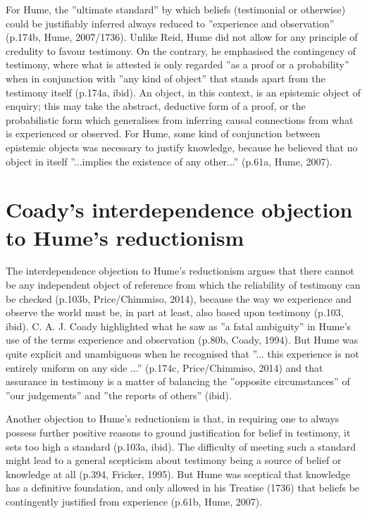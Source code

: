 \documentclass[a4paper, 11pt]{article} %
\begin{document}
\vspace{10pt}

For Hume, the ''ultimate standard'' by which beliefs (testimonial or otherwise) could be justifiably inferred always reduced to ''experience and observation'' (p.174b, Hume, 2007/1736)\cite{Hume:2007}. Unlike Reid, Hume did not allow for any principle of credulity to favour testimony. On the contrary, he emphasised the contingency of testimony, where what is attested is only regarded ''as a proof or a probability'' when in conjunction with ''any kind of object'' that stands apart from the testimony itself (p.174a, ibid)\cite{Hume:2007}. An object, in this context, is an epistemic object of enquiry; this may take the abstract, deductive form of a proof, or the probabilistic form which generalises from inferring causal connections from what is experienced or observed. For Hume, some kind of conjunction between epistemic objects was necessary to justify knowledge, because he believed that no object in itself ''...implies the existence of any other...'' (p.61a, Hume, 2007)\cite{Hume:2007}. 

\section*{Coady's interdependence objection to Hume's reductionism}

The interdependence objection to Hume's reductionism argues that there cannot be any independent object of reference from which the reliability of testimony can be checked (p.103b, Price/Chimmiso, 2014)\cite{Price/Chismisso:2014}, because the way we experience and observe the world must be, in part at least, also based upon testimony (p.103, ibid). C. A. J. Coady highlighted what he saw as ''a fatal ambiguity'' in Hume's use of the terms experience and observation (p.80b, Coady, 1994)\cite{Coady:1994}. But Hume was quite explicit and unambiguous when he recognised that ''... this experience is not entirely uniform on any side ...'' (p.174c, Price/Chimmiso, 2014)\cite{Price/Chismisso:2014} and that assurance in testimony is a matter of balancing the ''opposite circumstances'' of ''our judgements'' and ''the reports of others'' (ibid)\cite{Price/Chismisso:2014}. 

\vspace{10pt}

Another objection to Hume's reductionism is that, in requiring one to always possess further positive reasons to ground justification for belief in testimony, it sets too high a standard (p.103a, ibid)\cite{Price/Chismisso:2014}. The difficulty of meeting such a standard might lead to a general scepticism about testimony being a source of belief or knowledge at all (p.394, Fricker, 1995)\cite{Fricker:1995}. But Hume was sceptical that knowledge has a definitive foundation, and only allowed in his Treatise (1736) that beliefs be contingently justified from experience (p.61b, Hume, 2007)\cite{Hume:2007}. 
\end{document}
